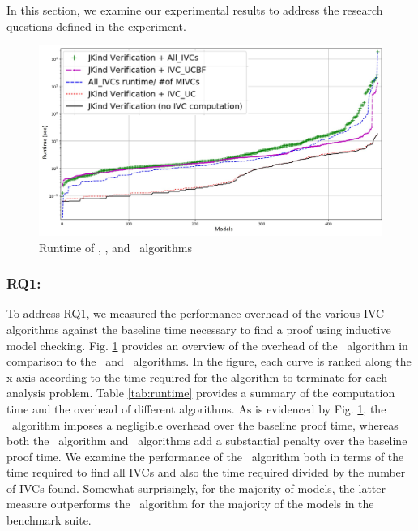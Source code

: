 In this section, we examine our experimental results to address the research questions defined in the experiment.

\begin{figure}[t]
 \centering
  \includegraphics[width=\textwidth]{figs/performance.jpg}
  \vspace{-0.2in}
  \caption{Runtime of \aivcalg, \ucbfalg, and \ucalg ~algorithms}
  \label{fig:performance}
\end{figure}

\subsubsection{RQ1:} 

To address RQ1, we measured the performance overhead of the various IVC algorithms against the baseline time
necessary to find a proof using inductive model checking. Fig. \ref{fig:performance} provides an overview of the  overhead of the \aivcalg ~algorithm in comparison to the \ucalg ~and \ucbfalg\ algorithms.  In the figure, each curve is ranked along the x-axis according to the time required for the algorithm to terminate for each analysis problem.  Table \ref{tab:runtime} provides a summary of the computation time and the overhead of different algorithms.  As is evidenced by Fig. \ref{fig:performance}, the \ucalg\  algorithm imposes a negligible overhead over the baseline proof time, whereas both the \ucbfalg\ algorithm and \aivcalg\ algorithms add a substantial penalty over the baseline proof time.  We examine the performance of the \aivcalg\ algorithm both in terms of the time required to find all IVCs and also the time required divided by the number of IVCs found.  Somewhat surprisingly, for the majority of models, the latter measure outperforms the \ucbfalg\ algorithm for the majority of the models in the benchmark suite.

